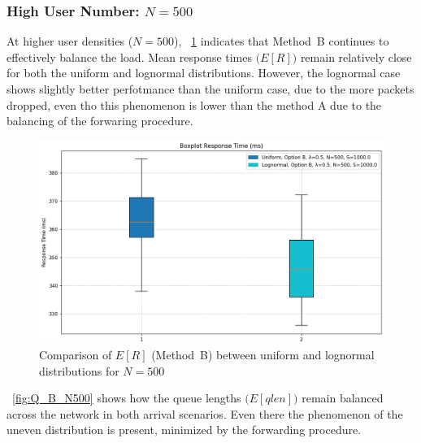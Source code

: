 \documentclass{report}
\begin{document}
\subsubsection{\textbf{High User Number: \(N = 500\)}}

At higher user densities (\(N = 500\)), \figurename~\ref{fig:R_B_N500} indicates that Method~B continues to effectively balance the load. Mean response times \(\bigl(E[R]\bigr)\) remain relatively close for both the uniform and lognormal distributions. However, the lognormal case shows slightly better perfotmance than the uniform case, due to the more packets dropped, even tho this phenomenon is lower than the method A due to the balancing of the forwaring procedure.

\begin{figure}[H]
    \centering
    \includegraphics[width=\textwidth]{img/plots/N-vary/R_B_N500.png}
    \caption{Comparison of \(E[R]\) (Method~B) between uniform and lognormal distributions for \(N = 500\)}
    \label{fig:R_B_N500}
\end{figure}

\begin{flushleft}
\figurename~\ref{fig:Q_B_N500} shows how the queue lengths \(\bigl(E[qlen]\bigr)\) remain balanced across the network in both arrival scenarios. Even there the phenomenon of the uneven distribution is present, minimized by the forwarding procedure.
\end{flushleft}
\end{document}
